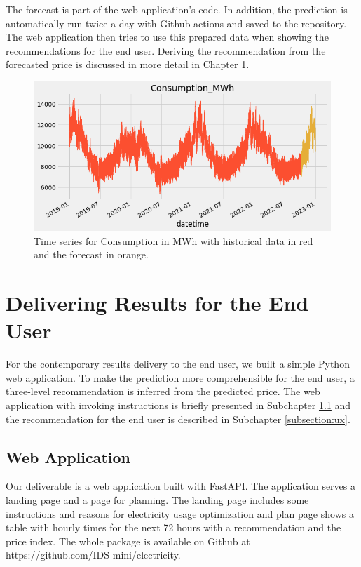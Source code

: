 \documentclass{article}
\begin{document}
The forecast is part of the web application's code. In addition, the prediction is automatically run twice a day with Github actions and saved to the repository. The web application then tries to use this prepared data when showing the recommendations for the end user. Deriving the recommendation from the forecasted price is discussed in more detail in Chapter \ref{section:delivery}. 

\begin{figure}
    \centering
    \includegraphics[width=15cm]{report/images/consumption.png}
    \caption{Time series for Consumption in MWh with historical data in red and the forecast in orange.}
    \label{fig:consumption}
\end{figure}


\section{Delivering Results for the End User}
\label{section:delivery}

For the contemporary results delivery to the end user, we built a simple Python web application. To make the prediction more comprehensible for the end user, a three-level recommendation is inferred from the predicted price. The web application with invoking instructions is briefly presented in Subchapter \ref{subsection:server} and the recommendation for the end user is described in Subchapter \ref{subsection:ux}.

\subsection{Web Application}
\label{subsection:server}

Our deliverable is a web application built with FastAPI. The application serves a landing page and a page for planning. The landing page includes some instructions and reasons for electricity usage optimization and plan page shows a table with hourly times for the next 72 hours with a recommendation and the price index. The whole package is available on Github at https://github.com/IDS-mini/electricity.
\end{document}
